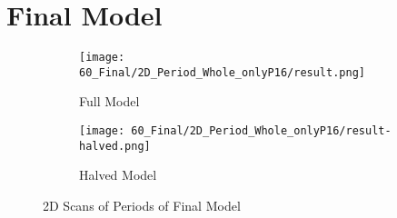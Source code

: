 \chapter{Final Model}




\begin{figure}
    \centering
    \begin{subfigure}{0.4\textwidth}
        \centering
        \texttt{[image: 60\_Final/2D\_Period\_Whole\_onlyP16/result.png]}
        \caption{Full Model}
        \label{fig:final.period.whole.full}
    \end{subfigure}
    \begin{subfigure}{0.4\textwidth}
        \centering
        \texttt{[image: 60\_Final/2D\_Period\_Whole\_onlyP16/result-halved.png]}
        \caption{Halved Model}
        \label{fig:final.period.whole.halved}
    \end{subfigure}
    \caption{2D Scans of Periods of Final Model}
\end{figure}




